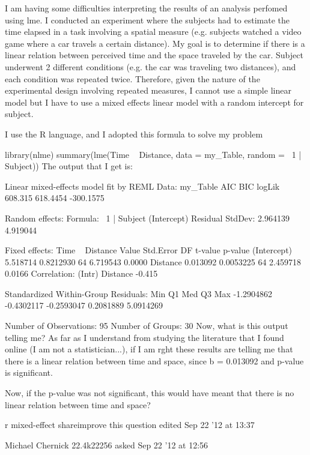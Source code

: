 I am having some difficulties interpreting the results of an analysis perfomed using lme. I conducted an experiment where the subjects had to estimate the time elapsed in a task involving a spatial measure (e.g. subjects watched a video game where a car travels a certain distance). My goal is to determine if there is a linear relation between perceived time and the space traveled by the car. Subject underwent 2 different conditions (e.g. the car was traveling two distances), and each condition was repeated twice. Therefore, given the nature of the experimental design involving repeated measures, I cannot use a simple linear model but I have to use a mixed effects linear model with a random intercept for subject.

I use the R language, and I adopted this formula to solve my problem

library(nlme)
summary(lme(Time ~ Distance, data = my_Table, random = ~1 | Subject))
The output that I get is:

Linear mixed-effects model fit by REML
 Data: my_Table 
      AIC      BIC    logLik
  608.315 618.4454 -300.1575

Random effects:
 Formula: ~1 | Subject
        (Intercept) Residual
StdDev:    2.964139 4.919044

Fixed effects: Time ~ Distance
                                          Value Std.Error DF  t-value p-value
(Intercept)                            5.518714 0.8212930 64 6.719543  0.0000
 Distance                              0.013092 0.0053225 64 2.459718  0.0166
 Correlation: 
                                       (Intr)
 Distance                              -0.415

Standardized Within-Group Residuals:
       Min         Q1        Med         Q3        Max 
-1.2904862 -0.4302117 -0.2593047  0.2081889  5.0914269 

Number of Observations: 95
Number of Groups: 30 
Now, what is this output telling me? As far as I understand from studying the literature that I found online (I am not a statistician...), if I am rght these results are telling me that there is a linear relation between time and space, since b = 0.013092 and p-value is significant.

Now, if the p-value was not significant, this would have meant that there is no linear relation between time and space?

r mixed-effect
shareimprove this question
edited Sep 22 '12 at 13:37

Michael Chernick
22.4k22256	
asked Sep 22 '12 at 12:56

